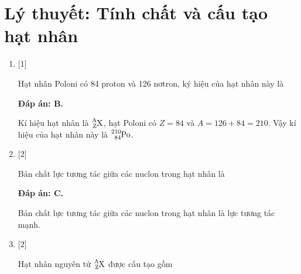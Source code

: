 \whiteBGstarBegin
\setcounter{section}{0}
\section{Lý thuyết: Tính chất và cấu tạo hạt nhân}
\begin{enumerate}[label=\bfseries Câu \arabic*:]
	\item {} [1]
	
	\cauhoi
	{Hạt nhân Poloni có 84 proton và 126 nơtron, ký hiệu của hạt nhân này là
	}
	
	\loigiai
	{		\textbf{Đáp án: B.}
		
		Kí hiệu hạt nhân là $\ce{^A_Z X}$, hạt Poloni có $Z=84$ và $A=126+84=210$. Vậy kí hiệu của hạt nhân này là $\ce{^210_84 Po}$.
		
	}
	
	\item {} [2]
	
	\cauhoi
	{Bản chất lực tương tác giữa các nuclon trong hạt nhân là
	}
	
	\loigiai
	{		\textbf{Đáp án: C.}
		
		Bản chất lực tương tác giữa các nuclon trong hạt nhân là lực tương tác mạnh.
		
	}
	
	\item {} [2]
	
	\cauhoi
	{Hạt nhân nguyên tử $\ce{^A_Z X}$ được cấu tạo gồm
	}
	

\end{enumerate}

